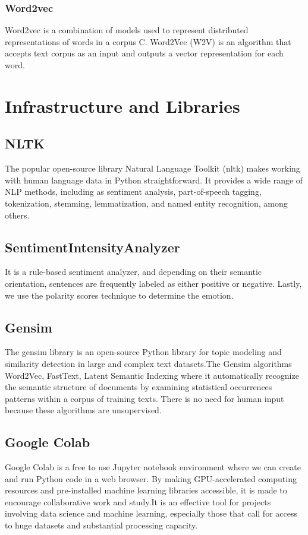 \subsubsection{Word2vec}
Word2vec is a combination of models used to represent distributed representations of words in a corpus C. Word2Vec (W2V) is an algorithm that accepts text corpus as an input and outputs a vector representation for each word.

\section{Infrastructure and Libraries }
\subsection{NLTK}
The popular open-source library  Natural Language Toolkit (nltk) makes working with human language data in Python straightforward. It provides a wide range of NLP methods, including as sentiment analysis, part-of-speech tagging, tokenization, stemming, lemmatization, and named entity recognition, among others.
\subsection{SentimentIntensityAnalyzer}
It is a rule-based sentiment analyzer, and depending on their semantic orientation, sentences are frequently labeled as either positive or negative. Lastly, we use the polarity scores technique to determine the emotion.
\subsection{Gensim}
The gensim library is an open-source Python library for topic modeling and similarity detection in large and complex text datasets.The Gensim algorithms Word2Vec, FastText, Latent Semantic Indexing where it automatically recognize the semantic structure of documents by examining statistical  occurrences patterns within a corpus of training texts. There is no need for human input because these algorithms are unsupervised.
\subsection{Google Colab}
Google Colab is a free to use Jupyter notebook environment where we can create and run Python code in a web browser. By making GPU-accelerated computing resources and pre-installed machine learning libraries accessible, it is made to encourage collaborative work and study.It is an effective  tool for projects involving data science and machine learning, especially those that call for access to huge datasets and substantial processing capacity.
